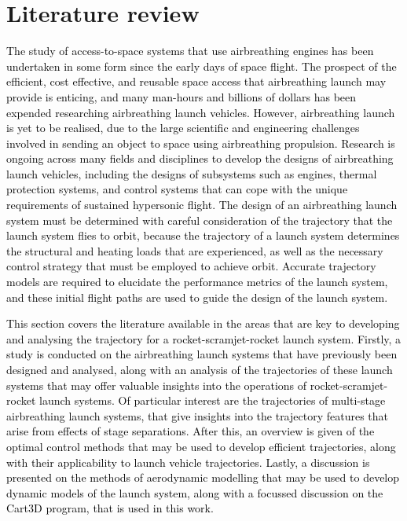 
\cleardoublepage
\chapter{Literature review}\label{chapter:literature-review}

	
  \textcolor{black}{
  The study of access-to-space systems that use airbreathing engines has been undertaken in some form since the early days of space flight. The prospect of the efficient, cost effective, and reusable space access that airbreathing launch may provide is enticing, and many man-hours and billions of dollars has been expended researching airbreathing launch vehicles. However, airbreathing launch is yet to be realised, due to the large scientific and engineering challenges involved in sending an object to space using airbreathing propulsion. Research is ongoing across many fields and disciplines to develop the designs of airbreathing launch vehicles, including the designs of subsystems such as engines, thermal protection systems, and control systems that can cope with the unique requirements of sustained hypersonic flight. 
}
\textcolor{black}{
  The design of an airbreathing launch system must be determined with careful consideration of the trajectory that the launch system flies to orbit, because the trajectory of a launch system determines the structural and heating loads that are experienced, as well as the necessary control strategy that must be employed to achieve orbit. Accurate trajectory models are required to elucidate the performance metrics of the launch system, and these initial flight paths are used to guide the design of the launch system.
}



\textcolor{black}{
This section covers the literature available in the areas that are key to developing and analysing the trajectory for a rocket-scramjet-rocket launch system. 
Firstly, a study is conducted on the airbreathing launch systems that have previously been designed and analysed, along with an analysis of the trajectories of these launch systems that may offer valuable insights into the operations of rocket-scramjet-rocket launch systems. Of particular interest are the trajectories of multi-stage airbreathing launch systems, that give insights into the trajectory features that arise from effects of stage separations. 
After this, an overview is given of the optimal control methods that may be used to develop efficient trajectories, along with their applicability to launch vehicle trajectories. 
Lastly, a discussion is presented on the methods of aerodynamic modelling that may be used to develop dynamic models of the launch system, along with a focussed discussion on the Cart3D program, that is used in this work. 
}


